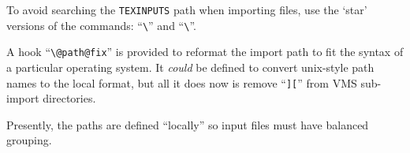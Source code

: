 \documentclass[DIV=8, parskip=half, pagesize=auto]{scrartcl}
\makeatletter
\newcommand*{\cs}[1]{\texttt{\textbackslash#1}}
\newcommand*{\cmd}[1]{\cs{\expandafter\@gobble\string#1}}
\makeatother
\begin{document}
To avoid searching the \texttt{TEXINPUTS} path when importing files, use the `star'
versions of the commands: ``\cmd{}'' and ``\cmd{}''.

A hook ``\cmd{@path@fix}'' is provided to reformat the import path
to fit the syntax of a particular operating system.  It \emph{could} be
defined to convert unix-style path names to the local format, but 
all it does now is remove ``\texttt{][}'' from VMS sub-import directories.

Presently, the paths are defined ``locally'' so input files must have 
balanced grouping.
\end{document}
